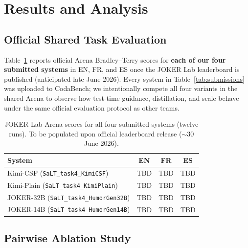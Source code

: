\documentclass[]{ceurart}
\begin{document}
\section{Results and Analysis}
\label{sec:results}

\subsection{Official Shared Task Evaluation}
\label{sec:arena}

Table~\ref{tab:arena} reports official Arena Bradley--Terry scores for
\textbf{each of our four submitted systems} in EN, FR, and ES once the JOKER
Lab leaderboard is published (anticipated late June 2026).
Every system in Table~\ref{tab:submissions} was uploaded to CodaBench; we
intentionally compete all four variants in the shared Arena to observe how
test-time guidance, distillation, and scale behave under the same official
evaluation protocol as other teams.

\begin{table}[t]
  \caption{JOKER Lab Arena scores for all four submitted systems (twelve runs).
    To be populated upon official leaderboard release (${\sim}$30 June 2026).}
  \label{tab:arena}
  \small
  \begin{tabular}{lccc}
    \toprule
    System & EN & FR & ES \\
    \midrule
    Kimi-CSF    (\texttt{SaLT\_task4\_KimiCSF})       & \multicolumn{1}{c}{TBD} & \multicolumn{1}{c}{TBD} & \multicolumn{1}{c}{TBD} \\
    Kimi-Plain  (\texttt{SaLT\_task4\_KimiPlain})      & \multicolumn{1}{c}{TBD} & \multicolumn{1}{c}{TBD} & \multicolumn{1}{c}{TBD} \\
    JOKER-32B   (\texttt{SaLT\_task4\_HumorGen32B})   & \multicolumn{1}{c}{TBD} & \multicolumn{1}{c}{TBD} & \multicolumn{1}{c}{TBD} \\
    JOKER-14B   (\texttt{SaLT\_task4\_HumorGen14B})   & \multicolumn{1}{c}{TBD} & \multicolumn{1}{c}{TBD} & \multicolumn{1}{c}{TBD} \\
    \bottomrule
  \end{tabular}
\end{table}

\subsection{Pairwise Ablation Study}
\label{sec:interim-results}
\end{document}
